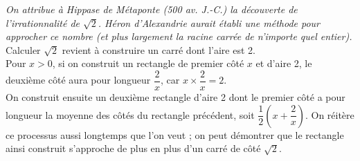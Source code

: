 \documentclass[a4paper,11pt,exos]{nsi} %
\begin{document}
\textit{On attribue à Hippase de Métaponte (500 av. J.-C.) la découverte de l'irrationnalité de $\sqrt{2}$. Héron d'Alexandrie aurait établi une méthode pour approcher ce nombre (et plus largement la racine carrée de n'importe quel entier).}\\[.5em]
Calculer $\sqrt{2}$ revient à construire un carré dont l'aire est 2.\\[.5em]
Pour $x>0$, si on construit un rectangle de premier côté $x$ et d'aire 2, le deuxième côté aura pour longueur $\dfrac{2}{x}$, car $x\times \dfrac{2}{x}=2$.\\[.5em]
\faLightbulb \hspace*{.3cm} On construit ensuite un deuxième rectangle d'aire 2 dont le premier côté a pour longueur la moyenne des côtés du rectangle précédent, soit $\dfrac{1}{2}\left(x+\dfrac{2}{x}\right)$. On réitère ce processus aussi longtemps que l'on veut ; on peut démontrer que le rectangle ainsi construit s'approche de plus en plus d'un carré de côté $\sqrt{2}$.
\end{document}
